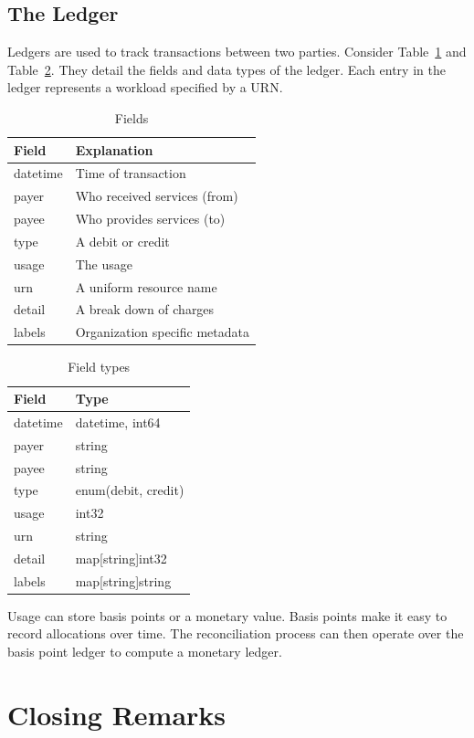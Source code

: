 \documentclass[10pt, a4paper, twocolumn]{article}
\begin{document}
  \subsection*{The Ledger}
    Ledgers are used to track transactions between two parties.
    Consider Table~\ref{table:2} and Table~\ref{table:3}.
    They detail the fields and data types of the ledger.
    Each entry in the ledger represents a workload specified by a URN.

    \begin{table}[H]
      \centering
      \begin{tabular}{ l|l }
        Field & Explanation \\
        \hline
        datetime & Time of transaction \\
        payer & Who received services (from) \\
        payee & Who provides services (to) \\
        type & A debit or credit \\
        usage & The usage \\
        urn & A uniform resource name \\
        detail & A break down of charges \\
        labels & Organization specific metadata \\
      \end{tabular}
      \caption{Fields}
      \label{table:2}
    \end{table}

    \begin{table}[H]
      \centering
      \begin{tabular}{ l|l }
        Field & Type \\
        \hline
        datetime & datetime, int64 \\
        payer & string \\
        payee & string \\
        type & enum(debit, credit) \\
        usage & int32 \\
        urn & string \\
        detail & map[string]int32 \\
        labels & map[string]string \\
      \end{tabular}
      \caption{Field types}
      \label{table:3}
    \end{table}

    Usage can store basis points or a monetary value.
    Basis points make it easy to record allocations over time.
    The reconciliation process can then operate over the basis point ledger to compute a monetary ledger.

\section*{Closing Remarks}
\end{document}
